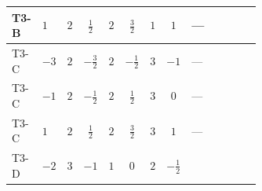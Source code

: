 \documentclass[8pt]{article}
\begin{document}
\begin{landscape}
\begin{longtable}{@{}llcccccc >{\raggedright\arraybackslash}p{0.21\linewidth} >{\raggedright\arraybackslash}p{0.21\linewidth} >{\raggedright\arraybackslash}p{0.21\linewidth}@{}}
\midrule
T3-B & $1$ & $2$ & $\frac{1}{2}$ & $2$ & $\frac{3}{2}$ & $1$ & $1$ & --- & \scriptsize\adjustbox{max width=\linewidth}{$\begin{gathered} -\frac{9}{4} {g_2}^2 \left({Y_e}\right)_{ij}\end{gathered}$} & \scriptsize\adjustbox{max width=\linewidth}{$\begin{gathered} -\frac{15}{4} {g_1}^2 \left({Y_e}\right)_{ij}\end{gathered}$} \\
\midrule
T3-C & $-3$ & $2$ & $-\frac{3}{2}$ & $2$ & $-\frac{1}{2}$ & $3$ & $-1$ & --- & \scriptsize\adjustbox{max width=\linewidth}{$\begin{gathered} -\frac{9}{4} {g_2}^2 \left({Y_e}\right)_{ij}\end{gathered}$} & \scriptsize\adjustbox{max width=\linewidth}{$\begin{gathered} -\frac{15}{4} {g_1}^2 \left({Y_e}\right)_{ij}\end{gathered}$} \\
\midrule
T3-C & $-1$ & $2$ & $-\frac{1}{2}$ & $2$ & $\frac{1}{2}$ & $3$ & $0$ & --- & \scriptsize\adjustbox{max width=\linewidth}{$\begin{gathered} -\frac{9}{4} {g_2}^2 \left({Y_e}\right)_{ij}\end{gathered}$} & \scriptsize\adjustbox{max width=\linewidth}{$\begin{gathered} -\frac{15}{4} {g_1}^2 \left({Y_e}\right)_{ij}\end{gathered}$} \\
\midrule
T3-C & $1$ & $2$ & $\frac{1}{2}$ & $2$ & $\frac{3}{2}$ & $3$ & $1$ & --- & \scriptsize\adjustbox{max width=\linewidth}{$\begin{gathered} -\frac{9}{4} {g_2}^2 \left({Y_e}\right)_{ij}\end{gathered}$} & \scriptsize\adjustbox{max width=\linewidth}{$\begin{gathered} -\frac{15}{4} {g_1}^2 \left({Y_e}\right)_{ij}\end{gathered}$} \\
\midrule
T3-D & $-2$ & $3$ & $-1$ & $1$ & $0$ & $2$ & $-\frac{1}{2}$ & \scriptsize\adjustbox{max width=\linewidth}{$\begin{gathered} +\frac{1}{4} (3 \left({y_1}\,\left({y_1}\right)^{\dagger}\,{Y_e}\right)_{ij}+2 \left({y_2}\,\left({y_2}\right)^{\dagger}\,{Y_e}\right)_{ij}+6 \left({Y_e}\,\left({Y_e}\right)^{\dagger}\,{Y_e}\right)_{ij})\end{gathered}$} & \scriptsize\adjustbox{max width=\linewidth}{$\begin{gathered} -\frac{9}{4} {g_2}^2 \left({Y_e}\right)_{ij}\end{gathered}$} & \scriptsize\adjustbox{max width=\linewidth}{$\begin{gathered} -\frac{15}{4} {g_1}^2 \left({Y_e}\right)_{ij}\end{gathered}$} \\

\end{longtable}
\end{landscape}
\end{document}
